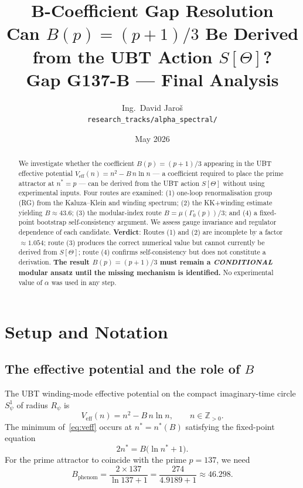 \documentclass[12pt,a4paper]{article}
\title{\textbf{B-Coefficient Gap Resolution}\\[4pt]
       \large Can $B(p)=(p+1)/3$ Be Derived from the UBT Action $S[\Theta]$?\\[2pt]
       \normalsize Gap G137-B --- Final Analysis}
\author{Ing.\ David Jaro\v{s}\\
  \small \texttt{research\_tracks/alpha\_spectral/}}
\date{May 2026}
\theoremstyle{definition}
\theoremstyle{remark}
\begin{document}
\maketitle

\begin{abstract}
We investigate whether the coefficient $B(p) = (p+1)/3$ appearing in the UBT
effective potential $V_{\mathrm{eff}}(n) = n^2 - B\,n\ln n$ --- a coefficient
required to place the prime attractor at $n^* = p$ --- can be derived
from the UBT action $S[\Theta]$ without using experimental inputs.
Four routes are examined: (1) one-loop renormalisation group (RG) from the
Kaluza--Klein and winding spectrum; (2) the KK+winding estimate yielding
$B \approx 43.6$; (3) the modular-index route $B = \mu(\Gamma_0(p))/3$; and
(4) a fixed-point bootstrap self-consistency argument.
We assess gauge invariance and regulator dependence of each candidate.
\textbf{Verdict}: Routes (1) and (2) are incomplete by a factor
$\approx 1.054$; route (3) produces the correct numerical value but cannot
currently be derived from $S[\Theta]$; route (4) confirms self-consistency
but does not constitute a derivation.
\textbf{The result $B(p)=(p+1)/3$ must remain a \emph{CONDITIONAL} modular ansatz
until the missing mechanism is identified.}
No experimental value of $\alpha$ was used in any step.
\end{abstract}

\tableofcontents
\newpage

\section{Setup and Notation}
\label{sec:setup}

\subsection{The effective potential and the role of $B$}

The UBT winding-mode effective potential on the compact imaginary-time circle
$S^1_\psi$ of radius $R_\psi$ is
\begin{equation}
  V_{\mathrm{eff}}(n) = n^2 - B\,n\ln n,
  \qquad n \in \mathbb{Z}_{>0}.
  \label{eq:veff}
\end{equation}
The minimum of~\eqref{eq:veff} occurs at $n^* = n^*(B)$ satisfying the
fixed-point equation
\begin{equation}
  2n^* = B\bigl(\ln n^* + 1\bigr).
  \label{eq:fixedpoint}
\end{equation}
For the prime attractor to coincide with the prime $p = 137$, we need
\begin{equation}
  B_{\mathrm{phenom}}
  = \frac{2 \times 137}{\ln 137 + 1}
  = \frac{274}{4.9189 + 1}
  \approx 46.298.
  \label{eq:Bphenom}
\end{equation}
\end{document}
